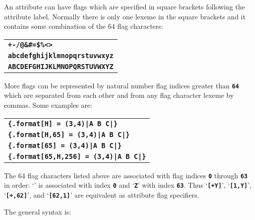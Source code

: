 \documentclass[12pt]{article}
\newcommand{\TT}[1]{{\tt \bfseries #1}}
\begin{document}
An attribute can have flags which are specified
in square brackets following the attribute label.
Normally there is only one lexeme in the square brackets
and it contains some combination of the 64 flag characters:
\begin{center}
\begin{tabular}{l}
\TT{*+-/@\&\#=\$\%<>} \\
\TT{abcdefghijklmnopqrstuvwxyz} \\
\TT{ABCDEFGHIJKLMNOPQRSTUVWXYZ} \\
\end{tabular}
\end{center}
More flags can be represented by natural number flag indices
greater than \TT{64} which are separated from each other
and from any flag character lexeme by commas.  Some examples
are:
\begin{center}
\begin{tabular}{l}
\TT{\{.format[H] = (3,4)|A B C|\}} \\
\TT{\{.format[H,65] = (3,4)|A B C|\}} \\
\TT{\{.format[65] = (3,4)|A B C|\}} \\
\TT{\{.format[65,H,256] = (3,4)|A B C|\}} \\
\end{tabular}
\end{center}

The 64 flag characters listed above are associated with flag
indices \TT{0} through \TT{63} in order: `\TT{*}' is associated
with index \TT{0} and `\TT{Z}' with index \TT{63}.
Thus `\TT{[+Y]}', `\TT{[1,Y]}', `\TT{[+,62]}', and `\TT{[62,1]}'
are equivalent as attribute flag specifiers.


The general syntax is:
\end{document}
